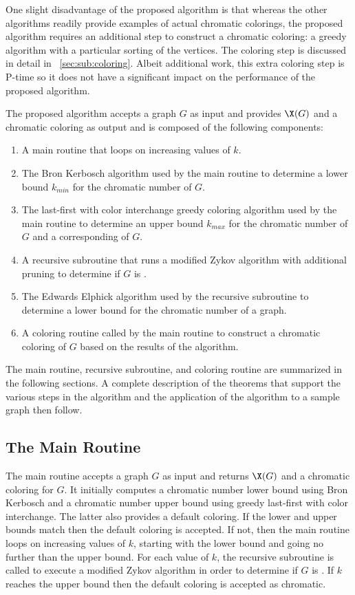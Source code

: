 One slight disadvantage of the proposed algorithm is that whereas the other algorithms readily provide examples of
actual chromatic colorings, the proposed algorithm requires an additional step to construct a chromatic coloring: a
greedy algorithm with a particular sorting of the vertices.  The coloring step is discussed in detail in
\sectionname~\ref{sec:sub:coloring}.  Albeit additional work, this extra coloring step is P-time so it does not
have a significant impact on the performance of the proposed algorithm.

The proposed algorithm accepts a graph \(G\) as input and provides \(\X(G)\) and a chromatic coloring as output and
is composed of the following components:
\begin{enumerate}
\item A main routine that loops on increasing values of \(k\).
\item The Bron Kerbosch algorithm used by the main routine to determine a lower bound \(k_{min}\) for the chromatic
  number of \(G\).
\item The last-first with color interchange greedy coloring algorithm used by the main routine to determine an
  upper bound \(k_{max}\) for the chromatic number of \(G\) and a corresponding  of \(G\).
\item A recursive subroutine that runs a modified Zykov algorithm with additional pruning to determine if
  \(G\) is .
\item The Edwards Elphick algorithm used by the recursive subroutine to determine a lower bound for the chromatic
  number of a graph.
\item A coloring routine called by the main routine to construct a chromatic coloring of \(G\) based on the results
  of the algorithm.
\end{enumerate}

The main routine, recursive subroutine, and coloring routine are summarized in the following sections.  A complete
description of the theorems that support the various steps in the algorithm and the application of the algorithm to
a sample graph then follow.

\subsection{The Main Routine}\label{sec:sub:main}

The main routine accepts a graph \(G\) as input and returns \(\X(G)\) and a chromatic coloring for \(G\).  It
initially computes a chromatic number lower bound using Bron Kerbosch and a chromatic number upper bound using
greedy last-first with color interchange.  The latter also provides a default coloring.  If the lower and upper
bounds match then the default coloring is accepted.  If not, then the main routine loops on increasing values of
\(k\), starting with the lower bound and going no further than the upper bound.  For each value of \(k\), the
recursive subroutine is called to execute a modified Zykov algorithm in order to determine if \(G\) is
.  If \(k\) reaches the upper bound then the default coloring is accepted as chromatic.

